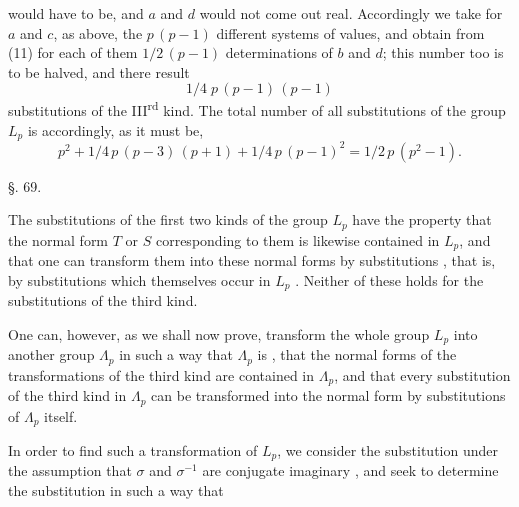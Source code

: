 would have to be, and $a$ and $d$ would not come out real. Accordingly
we take for $a$ and $c$, as above, the $p\,(p-1)$ different
systems of values, and obtain from (11) for each of them
$1/2\,(p-1)$ determinations of $b$ and $d$; this number too is to be
halved, and there result
\[
1/4\;p\,(p-1)\,(p-1)
\]
substitutions of the III\textsuperscript{rd} kind. The total number of all substitutions
 of the group $L_p$ is accordingly, as it must be,
\[
p^2 + 1/4\,p\,(p-3)\,(p+1) + 1/4\,p\,(p-1)^2 = 1/2\,p\,(p^2-1).
\]

\begin{center}
§. 69.

\end{center}

The substitutions of the first two kinds of the group $L_p$
have the property that the normal form $T$ or $S$ corresponding
 to them is likewise contained in $L_p$, and that one can
transform them into these normal forms by  substitutions
, that is, by substitutions which themselves occur in $L_p$
. Neither of these holds for the substitutions of the third
kind.

One can, however, as we shall now prove, transform the whole
group $L_p$ into another group $\Lambda_p$ in such a way that $\Lambda_p$ is
, that the
normal forms of the transformations of the third kind are contained
in $\Lambda_p$, and that every substitution of the third kind in $\Lambda_p$ can
be transformed into the normal form by substitutions of
$\Lambda_p$ itself.

In order to find such a transformation of $L_p$, we consider
the substitution
under the assumption that $\sigma$ and $\sigma^{-1}$ are conjugate imaginary
, and seek to determine the substitution
in such a way that
